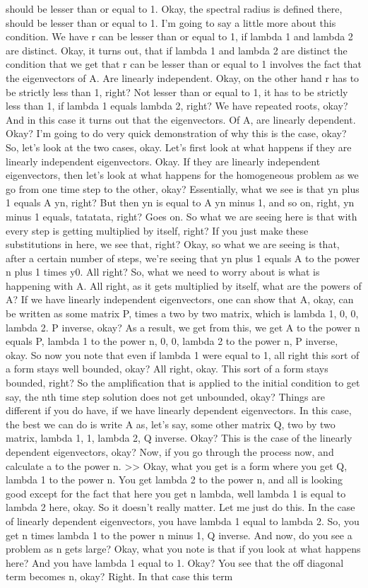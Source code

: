 \documentclass[10pt]{article}
\begin{document}
should be lesser than or equal to 1. Okay, the spectral radius is defined there, should be lesser than or equal to 1. I'm going to say a little more about this condition. We have r can be lesser than or equal to 1, if lambda 1 and lambda 2 are distinct. Okay, it turns out, that if lambda 1 and lambda 2 are distinct the condition that we get that r can be lesser than or equal to 1 involves the fact that the eigenvectors of A. Are linearly independent. Okay, on the other hand r has to be strictly less than 1, right? Not lesser than or equal to 1, it has to be strictly less than 1, if lambda 1 equals lambda 2, right? We have repeated roots, okay? And in this case it turns out that the eigenvectors. Of A, are linearly dependent. Okay? I'm going to do very quick demonstration of why this is the case, okay? So, let's look at the two cases, okay. Let's first look at what happens if they are linearly independent eigenvectors. Okay. If they are linearly independent eigenvectors, then let's look at what happens for the homogeneous problem as we go from one time step to the other, okay? Essentially, what we see is that yn plus 1 equals A yn, right? But then yn is equal to A yn minus 1, and so on, right, yn minus 1 equals, tatatata, right? Goes on. So what we are seeing here is that with every step is getting multiplied by itself, right? If you just make these substitutions in here, we see that, right? Okay, so what we are seeing is that, after a certain number of steps, we're seeing that yn plus 1 equals A to the power n plus 1 times y0. All right? So, what we need to worry about is what is happening with A. All right, as it gets multiplied by itself, what are the powers of A? If we have linearly independent eigenvectors, one can show that A, okay, can be written as some matrix P, times a two by two matrix, which is lambda 1, 0, 0, lambda 2. P inverse, okay? As a result, we get from this, we get A to the power n equals P, lambda 1 to the power n, 0, 0, lambda 2 to the power n, P inverse, okay. So now you note that even if lambda 1 were equal to 1, all right this sort of a form stays well bounded, okay? All right, okay. This sort of a form stays bounded, right? So the amplification that is applied to the initial condition to get say, the nth time step solution does not get unbounded, okay? Things are different if you do have, if we have linearly dependent eigenvectors. In this case, the best we can do is write A as, let's say, some other matrix Q, two by two matrix, lambda 1, 1, lambda 2, Q inverse. Okay? This is the case of the linearly dependent eigenvectors, okay? Now, if you go through the process now, and calculate a to the power n. >> Okay, what you get is a form where you get Q, lambda 1 to the power n. You get lambda 2 to the power n, and all is looking good except for the fact that here you get n lambda, well lambda 1 is equal to lambda 2 here, okay. So it doesn't really matter. Let me just do this. In the case of linearly dependent eigenvectors, you have lambda 1 equal to lambda 2. So, you get n times lambda 1 to the power n minus 1, Q inverse. And now, do you see a problem as n gets large? Okay, what you note is that if you look at what happens here? And you have lambda 1 equal to 1. Okay? You see that the off diagonal term becomes n, okay? Right. In that case this term 
\end{document}
